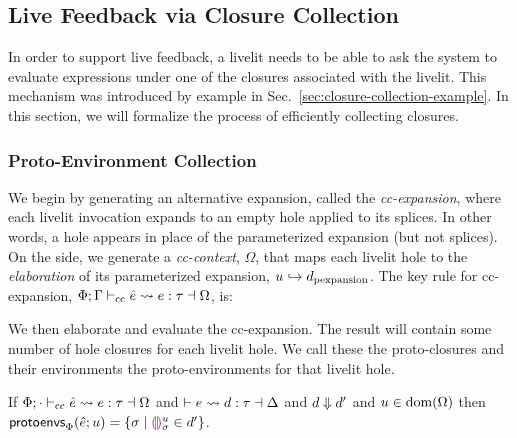 \subsection{Live Feedback via Closure Collection}\label{sec:calculus-closure-collection}
In order to support live feedback, a livelit needs to be able to ask the system
to evaluate expressions under one of the closures associated with the livelit.
This mechanism was introduced by example in Sec.~\ref{sec:closure-collection-example}.
In this section, we will formalize the process of efficiently collecting closures.

\subsubsection{Proto-Environment Collection}
We begin by generating an alternative expansion,
called the \emph{cc-expansion},
where each livelit invocation expands to an empty hole applied to its splices. In other words,
a hole appears in place of the parameterized expansion (but not splices). On the side, we generate a \emph{cc-context}, $\Omega$,  that maps each livelit hole to the \emph{elaboration} of its parameterized expansion, $\Omegaitem{u}{\dtxt{pexpansion}}$.
The key rule for cc-expansion, $\ccexpands{\Phi}{\Gamma}{\hat e}{e}{\tau}{\Omega}$, is:
\begin{mathpar}
\end{mathpar}

We then elaborate and evaluate the cc-expansion. 
The result will contain some number of hole closures
for each livelit hole. We call these the proto-closures and their environments the proto-environments for that livelit hole.
\begin{definition}
If $\ccexpands{\Phi}{\cdot}{\hat e}{e}{\tau}{\Omega}$ and $\elabs{}{e}{d}{\tau}{\Delta}$
and $\evalsTo{d}{d'}$ and $u \in \domof{\Omega}$ then $\protoEnvsOf{\Phi}{\hat e}{u} = \{ \sigma \mid \dehole{u}{\sigma} \in d' \}$.
\end{definition}

